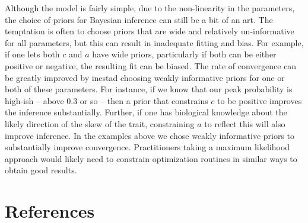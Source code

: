 \documentclass[
]{article}
\begin{document}
Although the model is fairly simple, due to the non-linearity in the
parameters, the choice of priors for Bayesian inference can still be a
bit of an art. The temptation is often to choose priors that are wide
and relatively un-informative for all parameters, but this can result in
inadequate fitting and bias. For example, if one lets both \(c\) and
\(a\) have wide priors, particularly if both can be either positive or
negative, the resulting fit can be biased. The rate of convergence can
be greatly improved by inestad choosing weakly informative priors for
one or both of these parameters. For instance, if we know that our peak
probability is high-ish -- above 0.3 or so -- then a prior that
constrains \(c\) to be positive improves the inference substantially.
Further, if one has biological knowledge about the likely direction of
the skew of the trait, constraining \(a\) to reflect this will also
improve inference. In the examples above we chose weakly informative
priors to substantially improve convergence. Practitioners taking a
maximum likelihood approach would likely need to constrain optimization
routines in similar ways to obtain good results.

\clearpage

\section{References}\label{references}
\end{document}
